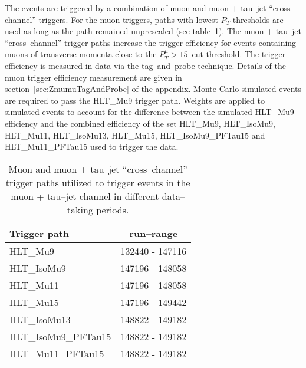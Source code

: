 The events are triggered by a combination of muon and muon + tau--jet
``cross--channel'' triggers. For the muon triggers, paths with lowest $P_{T}$
thresholds are used as long as the path remained unprescaled (see
table~\ref{tab:AHtoMuTauTriggers}). 
The muon + tau--jet ``cross--channel'' trigger paths increase the trigger efficiency for
events containing muons of transverse momenta close to the
$P_{T}^{\mu} > 15$~\GeV cut threshold.
The trigger efficiency is measured in data via the tag--and--probe
technique. Details of the muon trigger efficiency measurement are
given in section~\ref{sec:ZmumuTagAndProbe} of the appendix.
Monte Carlo simulated events are required to pass the
HLT\_Mu9 trigger path. Weights are applied to simulated events to account for the
difference between the simulated HLT\_Mu9 efficiency and the combined
efficiency of the set HLT\_Mu9, HLT\_IsoMu9, HLT\_Mu11, HLT\_IsoMu13,
HLT\_Mu15, HLT\_IsoMu9\_PFTau15 and HLT\_Mu11\_PFTau15 used to trigger
the data.

\begin{table}[t]
\begin{center}

\begin{tabular}{|l|c|}
\hline
Trigger path & run--range \\
\hline
HLT\_Mu9             & 132440 - 147116 \\
HLT\_IsoMu9          & 147196 - 148058 \\
HLT\_Mu11            & 147196 - 148058 \\
HLT\_Mu15            & 147196 - 149442 \\
HLT\_IsoMu13         & 148822 - 149182 \\
HLT\_IsoMu9\_PFTau15 & 148822 - 149182 \\
HLT\_Mu11\_PFTau15   & 148822 - 149182 \\
\hline
\end{tabular}
\end{center}
\begin{center}
\caption[High Level Triggers used to select $\mu + \tau_h$ events]{\captiontext
Muon and muon + tau--jet ``cross--channel'' trigger paths utilized to trigger
events in the muon + tau--jet channel in different data--taking periods.}
\label{tab:AHtoMuTauTriggers}
\end{center}
\end{table}

\ifx\master\undefined\fi
